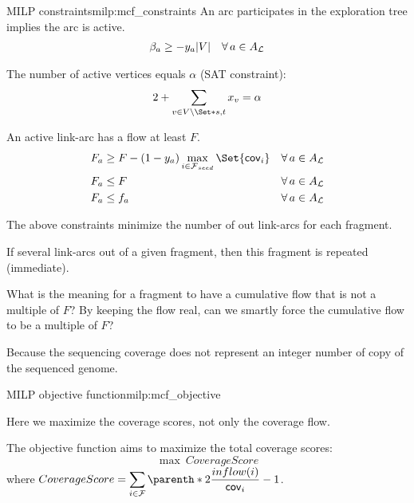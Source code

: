 \begin{definition}{\MCF{} MILP constraints}{milp:mcf_constraints}
  An arc participates in the exploration tree implies the arc is active.
  \begin{align}
    \beta_a \geq - y_a |V| \quad \forall a \in A_\Links{}
  \end{align}

  The number of active vertices equals \(\alpha{}\) (SAT constraint):
  \begin{align}
    2 + \sum_{v \in V \setminus \Set*{s, t}} x_v = \alpha
  \end{align}

  An active link-arc has a flow at least \(F\).
  \begin{align}
    F_a & \geq F - (1 - y_a) \max_{i \in \SeedFrags{}}\Set{\cov{i}} & \forall a \in A_\Links{} \\
    F_a & \leq F & \forall a \in A_\Links{} \\
    F_a & \leq f_a & \forall a \in A_\Links{} \label{const:arc_flow_at_least_total_flow}
  \end{align}
  \begin{infobox}
    The above constraints minimize the number of out link-arcs for each fragment.
  \end{infobox}
  \begin{missingproofbox}
    If several link-arcs out of a given fragment,
    then this fragment is repeated (immediate).
  \end{missingproofbox}
  \begin{questionbox}
    What is the meaning for a fragment to have a cumulative flow that is not a multiple of \(F\)?
    By keeping the flow real, can we smartly force the cumulative flow to be a multiple of \(F\)?

    \begin{notebox}
      Because the sequencing coverage does not represent an integer number of copy of the sequenced genome.
    \end{notebox}
  \end{questionbox}
\end{definition}

\begin{definition}{\MCF{} MILP objective function}{milp:mcf_objective}
  \begin{newfeatbox}
    Here we maximize the coverage scores, not only the coverage flow.
  \end{newfeatbox}
  The objective function aims to maximize the total coverage scores:
  \begin{equation}
    \max ~ CoverageScore
  \end{equation}
  where \(
    \displaystyle CoverageScore = %
    \sum_{i \in \Fragments{}} \parenth*{2 \frac{inflow(i)}{\cov{i}} - 1}
  \).
\end{definition}